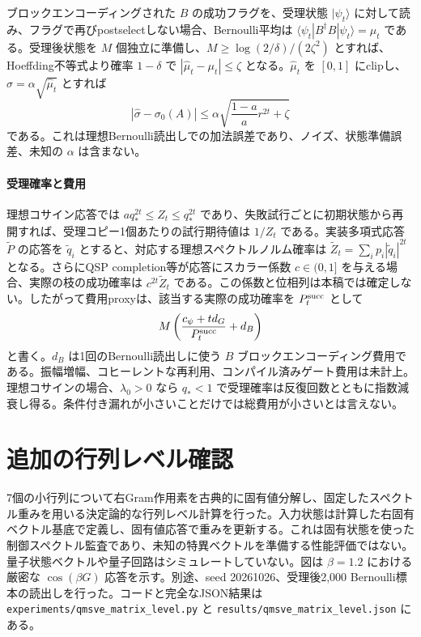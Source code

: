 \documentclass[11pt,a4paper]{article}
\newcommand{\ket}[1]{\lvert #1\rangle}
\begin{document}
{ブロックエンコーディングされた $B$ の成功フラグを、受理状態 $\ket{\psi_t}$ に対して読み、フラグで再びpostselectしない場合、Bernoulli平均は $\langle\psi_t|B^\dagger B|\psi_t\rangle=\mu_t$ である。受理後状態を $M$ 個独立に準備し、$M\geq\log(2/\delta)/(2\zeta^2)$ とすれば、Hoeffding不等式より確率 $1-\delta$ で $|\widehat\mu_t-\mu_t|\leq\zeta$ となる。$\widehat\mu_t$ を $[0,1]$ にclipし、$\widehat\sigma=\alpha\sqrt{\widehat\mu_t}$ とすれば
\[
 |\widehat\sigma-\sigma_0(A)|
 \leq \alpha\sqrt{\frac{1-a}{a}r^{2t}+\zeta}
\]
である。これは理想Bernoulli読出しでの加法誤差であり、ノイズ、状態準備誤差、未知の $\alpha$ は含まない。

\paragraph{受理確率と費用}
理想コサイン応答では $a q_*^{2t}\leq Z_t\leq q_*^{2t}$ であり、失敗試行ごとに初期状態から再開すれば、受理コピー1個あたりの試行期待値は $1/Z_t$ である。実装多項式応答 $\widetilde P$ の応答を $\widetilde q_i$ とすると、対応する理想スペクトルノルム確率は $\widetilde Z_t=\sum_i p_i|\widetilde q_i|^{2t}$ となる。さらにQSP completion等が応答にスカラー係数 $c\in(0,1]$ を与える場合、実際の枝の成功確率は $c^{2t}\widetilde Z_t$ である。この係数と位相列は本稿では確定しない。したがって費用proxyは、該当する実際の成功確率を $P_t^{\rm succ}$ として
\[
 M\left(\frac{c_\psi+t d_G}{P_t^{\rm succ}}+d_B\right)
\]
と書く。$d_B$ は1回のBernoulli読出しに使う $B$ ブロックエンコーディング費用である。振幅増幅、コヒーレントな再利用、コンパイル済みゲート費用は未計上。理想コサインの場合、$\lambda_0>0$ なら $q_*<1$ で受理確率は反復回数とともに指数減衰し得る。条件付き漏れが小さいことだけでは総費用が小さいとは言えない。



\section{追加の行列レベル確認}
7個の小行列について右Gram作用素を古典的に固有値分解し、固定したスペクトル重みを用いる決定論的な行列レベル計算を行った。入力状態は計算した右固有ベクトル基底で定義し、固有値応答で重みを更新する。これは固有状態を使った制御スペクトル監査であり、未知の特異ベクトルを準備する性能評価ではない。量子状態ベクトルや量子回路はシミュレートしていない。図は $\beta=1.2$ における厳密な $\cos(\beta G)$ 応答を示す。別途、seed 20261026、受理後2,000 Bernoulli標本の読出しを行った。コードと完全なJSON結果は \texttt{experiments/qmsve\_matrix\_level.py} と \texttt{results/qmsve\_matrix\_level.json} にある。

}
\end{document}
